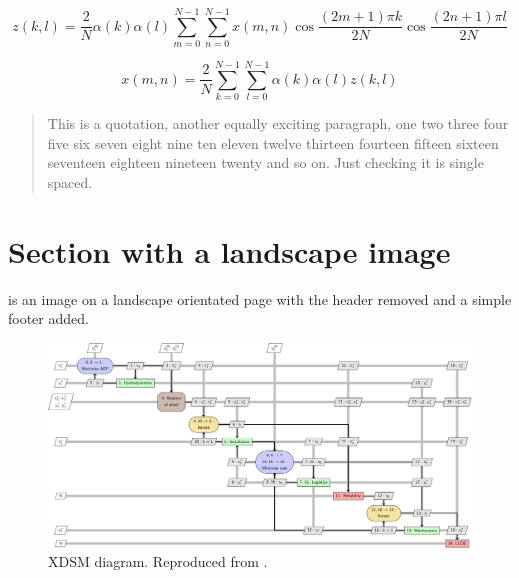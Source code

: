 \begin{equation} \label{eqn:dct}
z(k,l) = \frac{2}{N} \alpha(k) \alpha(l) \sum_{m=0}^{N-1} \sum_{n=0}^{N-1}
         x(m,n) \cos \frac{ (2m+1) \pi k}{2N} \cos \frac{ (2n+1) \pi l}{2N}
\end{equation}

\begin{equation} \label{eqn:idct}
x(m,n) = \frac{2}{N} \sum_{k=0}^{N-1} \sum_{l=0}^{N-1}
         \alpha(k) \alpha(l) z(k,l)
\end{equation}

\begin{quotation}
This is a quotation, another equally exciting paragraph, one two three
four five six seven eight nine ten eleven twelve thirteen fourteen
fifteen sixteen seventeen eighteen nineteen twenty and so on. Just
checking it is single spaced.
\end{quotation}

\section{Section with a landscape image}

 is an image on a landscape orientated page with
the header removed and a simple footer added.

\begin{landscape}
\thispagestyle{plain} %
\begin{figure}[p]
  \centering
    \includegraphics[width=\linewidth]{xdsm_sequential-crop}
    \caption{XDSM diagram. Reproduced from \citep{topper2021}.
    \label{fig:landscape}
}
\end{figure}
\end{landscape}

